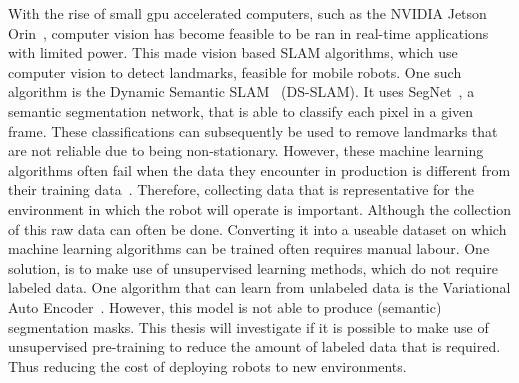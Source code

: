 With the rise of small gpu accelerated computers, such as the NVIDIA Jetson Orin~\cite{NVIDIA_Karumbunathan_2022}, computer vision has become feasible to be ran in real-time applications with limited power. This made vision based SLAM algorithms, which use computer vision to detect landmarks, feasible for mobile robots. One such algorithm is the Dynamic Semantic SLAM~\cite{yu2018ds} (DS-SLAM). It uses SegNet~\cite{badri2017segnet}, a semantic segmentation network, that is able to classify each pixel in a given frame. These classifications can subsequently be used to remove landmarks that are not reliable due to being non-stationary. However, these machine learning algorithms often fail when the data they encounter in production is different from their training data~\cite{Goodfellow-et-al-2016,ozdag2018adversarial,warde201611,10.14778/3632093.3632098,DBLP:journals/corr/KurakinGB16a,10.1145/3422622}. Therefore, collecting data that is representative for the environment in which the robot will operate is important. Although the collection of this raw data can often be done. Converting it into a useable dataset on which machine learning algorithms can be trained often requires manual labour. One solution, is to make use of unsupervised learning methods, which do not require labeled data. One algorithm that can learn from unlabeled data is the Variational Auto Encoder~\cite{kingma2014autoencodingvariationalbayes}. However, this model is not able to produce (semantic) segmentation masks. This thesis will investigate if it is possible to make use of unsupervised pre-training to reduce the amount of labeled data that is required. Thus reducing the cost of deploying robots to new environments.


